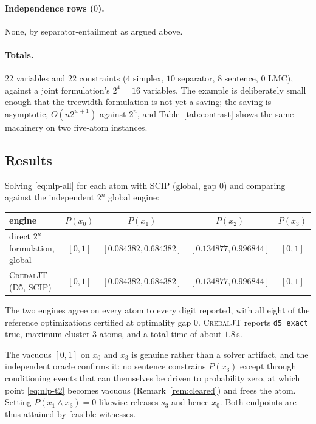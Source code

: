 \documentclass[11pt]{article}
\theoremstyle{definition}
\begin{document}
\paragraph{Independence rows ($0$).}
None, by separator-entailment as argued above.

\paragraph{Totals.}
$22$ variables and $22$ constraints ($4$ simplex, $10$ separator, $8$ sentence,
$0$ LMC), against a joint formulation's $2^4=16$ variables. The example is
deliberately small enough that the treewidth formulation is not yet a saving; the
saving is asymptotic, $O(n2^{w+1})$ against $2^n$, and Table~\ref{tab:contrast}
shows the same machinery on two five-atom instances.

\subsection{Results}

Solving \eqref{eq:nlp-all} for each atom with SCIP (global, gap $0$) and
comparing against the independent $2^n$ global engine:

\begin{center}\small
\begin{tabular}{@{}lcccc@{}}
\toprule
engine & $P(x_0)$ & $P(x_1)$ & $P(x_2)$ & $P(x_3)$ \\
\midrule
direct $2^n$ formulation, global & $[0,1]$ & $[0.084382,0.684382]$
  & $[0.134877,0.996844]$ & $[0,1]$ \\
\textsc{CredalJT} (D5, SCIP)              & $[0,1]$ & $[0.084382,0.684382]$
  & $[0.134877,0.996844]$ & $[0,1]$ \\
\bottomrule
\end{tabular}
\end{center}

\noindent The two engines agree on every atom to every digit reported, with all
eight of the reference optimizations certified at optimality gap $0$. \textsc{CredalJT} reports \texttt{d5\_exact} true, maximum
cluster $3$ atoms, and a total time of about $1.8$\,s.

The vacuous $[0,1]$ on $x_0$ and $x_3$ is genuine rather than a solver artifact,
and the independent oracle confirms it: no sentence constrains $P(x_3)$ except
through conditioning events that can themselves be driven to probability zero,
at which point \eqref{eq:nlp-t2} becomes vacuous (Remark~\ref{rem:cleared}) and
frees the atom. Setting $P(x_1\wedge x_3)=0$ likewise releases $s_3$ and hence
$x_0$. Both endpoints are thus attained by feasible witnesses.
\end{document}
